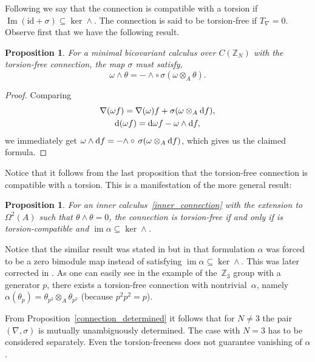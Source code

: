 \documentclass[10pt,a4paper]{amsart}
\numberwithin{equation}{section}
\newtheorem{Proposition}[Theorem]{Proposition}
 { \theoremstyle{definition}
\newtheorem{Definition}[Theorem]{Definition}
\newtheorem{Example}[Theorem]{Example}
\newtheorem{Remark}[Theorem]{Remark} }
\newcommand{\Z}{\mathbb{Z}}
\begin{document}
Following \cite{M13} we say that the connection is compatible with a torsion if $\operatorname{Im}(\mathrm{id}+\sigma)\subseteq \ker\wedge$.
The connection is said to be torsion-free if $T_\nabla=0$. Observe first that we have the following result.
\begin{Proposition}
For a minimal bicovariant calculus over $C(\Z_N)$ with the torsion-free connection, the map $\sigma$ must satisfy,
\begin{equation}
\omega \wedge \theta= - {\wedge} \circ \, \sigma(\omega \otimes_A \theta).
\label{sigmawedge}
\end{equation}
\end{Proposition}
\begin{proof}
Comparing
\begin{gather*}
\nabla(\omega f)=\nabla(\omega)f+\sigma(\omega\otimes_A {\rm d}f),\\
{\rm d}(\omega f)={\rm d}\omega f-\omega\wedge {\rm d}f,
\end{gather*}
we immediately get $ \omega \wedge {\rm d} f= - {\wedge}\circ\, \sigma(\omega \otimes_A {\rm d}f)$, which gives us the claimed formula.
\end{proof}

Notice that it follows from the last proposition that the torsion-free connection is compatible with a torsion. This is a manifestation of the more general result:
\begin{Proposition} For an inner calculus~\eqref{inner_connection} with the extension to $\Omega^2(A)$ such
that $\theta\wedge\theta=0$, the connection is torsion-free if and only if is torsion-compatible and $\operatorname{im} \alpha\subseteq\ker\wedge$.
\end{Proposition}
\begin{Remark}
Notice that the similar result was stated in \cite[Theorem~2.1(3)]{M13} but in that formulation $\alpha$ was forced to be a zero bimodule map instead of satisfying $\operatorname{im} \alpha\subseteq\ker\wedge$.
This was later corrected in \cite[Proposition~8.11]{BM_book}. As one can easily see in the example of the~$\mathbb{Z}_3$ group with
a generator $p$, there exists a torsion-free connection with nontrivial~$\alpha$, namely $\alpha(\theta_p)=\theta_{p^2}\otimes_A\theta_{p^2}$ (because $p^2 p^2 =p$).
\end{Remark}

From Proposition~\ref{connection_determined} it follows that for $N\neq 3$ the pair $(\nabla, \sigma)$ is mutually unambiguously determined. The case with $N=3$ has to be considered separately. Even the torsion-freeness does not guarantee vanishing of $\alpha$.
\end{document}
